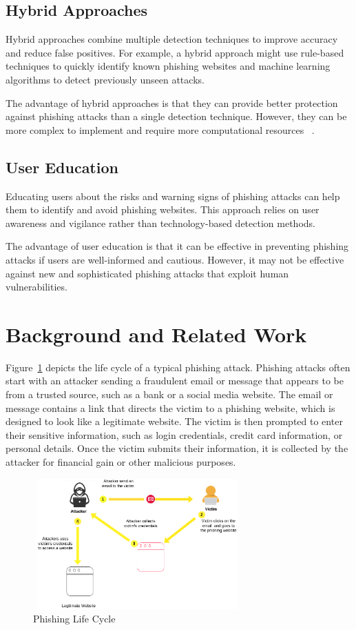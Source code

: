 \documentclass[final]{cvpr}
\begin{document}
\subsection{Hybrid Approaches}
Hybrid approaches combine multiple detection techniques to improve accuracy and reduce false positives. For example, a hybrid approach might use rule-based techniques to quickly identify known phishing websites and machine learning algorithms to detect previously unseen attacks.

The advantage of hybrid approaches is that they can provide better protection against phishing attacks than a single detection technique. However, they can be more complex to implement and require more computational resources ~\cite{phishing-detection2}.

\subsection{User Education}
Educating users about the risks and warning signs of phishing attacks can help them to identify and avoid phishing websites. This approach relies on user awareness and vigilance rather than technology-based detection methods.

The advantage of user education is that it can be effective in preventing phishing attacks if users are well-informed and cautious. However, it may not be effective against new and sophisticated phishing attacks that exploit human vulnerabilities.

\section{Background and Related Work}
\label{sec:Background and Related Work}

Figure~\ref{fig:phishinglifecycle}  depicts the life cycle of a typical phishing attack. Phishing attacks often start with an attacker sending a fraudulent email or message that appears to be from a trusted source, such as a bank or a social media website. The email or message contains a link that directs the victim to a phishing website, which is designed to look like a legitimate website. The victim is then prompted to enter their sensitive information, such as login credentials, credit card information, or personal details. Once the victim submits their information, it is collected by the attacker for financial gain or other malicious purposes.


\hspace*{-0.2in}
\begin{figure}[h]
   \centering
   \includegraphics[width=8cm, height=5cm]{phishing-life-cycle.png}
   \caption{Phishing Life Cycle}
   \label{fig:phishinglifecycle}
\end{figure}
\end{document}
